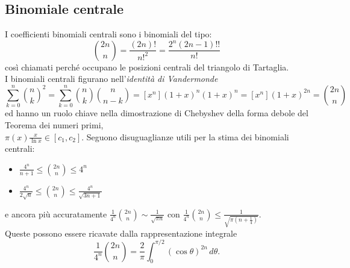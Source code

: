 \documentclass[a4paper,twoside]{article}
\theoremstyle{definition}
\numberwithin{theorem}{section}
\begin{document}
\subsection{Binomiale centrale}
I coefficienti binomiali centrali sono i binomiali del tipo:
$$\binom{2n}{n}=\frac{(2n)!}{n!^2}=\frac{2^n(2n-1)!!}{n!}$$
così chiamati perché occupano le posizioni centrali del triangolo di Tartaglia.\\ I binomiali centrali figurano nell'\emph{identità di Vandermonde}
$$ \sum_{k=0}^{n}\binom{n}{k}^2 = \sum_{k=0}^{n}\binom{n}{k}\binom{n}{n-k}=[x^n](1+x)^n (1+x)^n = [x^n](1+x)^{2n} = \binom{2n}{n} $$
ed hanno un ruolo chiave nella dimostrazione di Chebyshev della forma debole del Teorema dei numeri primi,\\ $\pi(x)\frac{x}{\ln x}\in [c_1,c_2]$. Seguono disuguaglianze utili per la stima dei binomiali centrali:
    \begin{itemize}
        \item $\frac{4^n}{n+1}\leq\binom{2n}{n}\leq4^n$
        \item $\frac{4^n}{2\sqrt{n}}\leq\binom{2n}{n}\leq\frac{4^n}{\sqrt{3n+1}}$
    \end{itemize}
e ancora più accuratamente $\frac{1}{4^n}\binom{2n}{n}\sim\frac{1}{\sqrt{\pi n}}$ con $\frac{1}{4^n}\binom{2n}{n}\leq \frac{1}{\sqrt{\pi\left(n+\frac{1}{4}\right)}}$.\\ Queste possono essere ricavate dalla rappresentazione integrale 
$$ \frac{1}{4^n}\binom{2n}{n} = \frac{2}{\pi}\int_{0}^{\pi/2}\left(\cos\theta\right)^{2n}\,d\theta. $$
    
\end{document}
